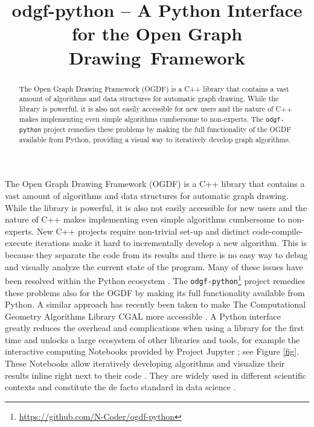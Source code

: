 \documentclass{llncs}
\title{odgf-python -- A Python Interface for the Open Graph Drawing~Framework%
}
\date{}
\begin{document}
\maketitle

\begin{abstract}
The Open Graph Drawing Framework (OGDF) is a C++ library that contains a vast amount of algorithms and data structures for automatic graph drawing.
While the library is powerful, it is also not easily accessible for new users and the nature of C++ makes implementing even simple algorithms cumbersome to non-experts.
The \texttt{odgf-python} project remedies these problems by making the full functionality of the OGDF available from Python, providing a visual way to iteratively develop graph algorithms.

\end{abstract}


The Open Graph Drawing Framework (OGDF) \cite{cgj-tog-13} is a C++ library that contains a vast amount of algorithms and data structures for
automatic graph drawing.
While the library is powerful, it is also not easily accessible for new users and the nature of C++ makes implementing even simple algorithms cumbersome to non-experts.
New C++ projects require non-trivial set-up and distinct code-compile-execute iterations make it hard to incrementally develop a new algorithm.
This is because they separate the code from its results and there is no easy way to debug and visually analyze the current state of the program.
Many of these issues have been resolved within the Python ecosystem \cite{per-tcc-21}.
The \texttt{odgf-python}\footnote{\url{https://github.com/N-Coder/ogdf-python}} project remedies these problems also for the OGDF by making its full functionality available from Python.
A similar approach has recently been taken to make The Computational Geometry Algorithms Library CGAL more accessible \cite{gfh-cmm-22}.
A Python interface greatly reduces the overhead and complications when using a library for the first time and unlocks a large ecosystem
of other libraries and tools, for example the interactive computing Notebooks provided by Project Jupyter \cite{krp-jn-16}; see Figure \ref{fig}.
These Notebooks allow iteratively developing algorithms and visualize their results inline right next to their code \cite{per-tcc-21}.
They are widely used in different scientific contexts and constitute the de facto standard in data science \cite{per-wji-18}.
\end{document}
